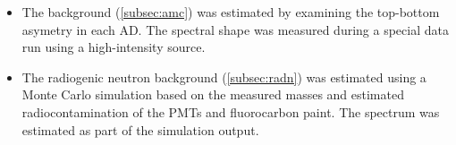 \begin{itemize}
        examining events occuring shortly following muon signals
        in the outer water shield (OWS), assumed to be fast neutrons.
        The assumption was validated by comparing the OWS-tagged spectrum
        to the nominal IBD-like spectrum at energies between \SIlist{12;100}{\MeV}.
        Normalizing the OWS-tagged spectrum to the nominal spectrum
        yields the number of background events within \SIrange{1.5}{12}{\MeV}.
        Uncertainties were determined by comparing the OWS-tagged spectrum
        below \SI{12}{\MeV} to a function which was fit to the IBD-like spectrum
        above \SI{12}{\MeV} and extrapolated to the energy range of interest.
    \item The \amc{} background (\cref{subsec:amc}) was estimated by
        examining the top-bottom asymetry in each AD.
        The spectral shape was measured during a special data run
        using a high-intensity \amc{} source.
    \item The radiogenic neutron background (\cref{subsec:radn})
        was estimated using a Monte Carlo simulation
        based on the measured masses and estimated
        radiocontamination of the PMTs and fluorocarbon paint.
        The spectrum was estimated as part of the simulation output.
\end{itemize}
